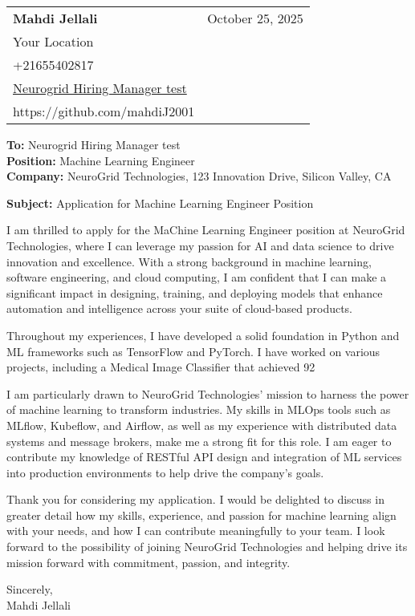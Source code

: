 \documentclass[letterpaper,11pt]{article}
\makeatletter
\newcommand{\letterHeading}[5]{
    \begin{tabular*}{\textwidth}{l@{\extracolsep{\fill}}r}
    \textbf{\Large #1} & #5 \\  %
    #2 & \\
    #3 & \\
    #4 & \\
    \end{tabular*}
    \vspace{15pt}
}
\newcommand{\letterRecipient}[3]{
    \textbf{\large To:} #1 \\
    \textbf{\large Position:} #2 \\
    \textbf{\large Company:} #3 \\
    \vspace{12pt}
}
\newcommand{\letterSubject}[1]{
    \textbf{\large Subject:} #1 \\
    \vspace{15pt}
}
\makeatother
\begin{document}
    \letterHeading
    {Mahdi Jellali}
    {Your Location}
    {+21655402817 \\ \href{mailto:Neurogrid Hiring Manager test}{Neurogrid Hiring Manager test}}
    {https://github.com/mahdiJ2001}
    {October 25, 2025}

    \letterRecipient
    {Neurogrid Hiring Manager test}
    {Machine Learning Engineer}
    {NeuroGrid Technologies, 123 Innovation Drive, Silicon Valley, CA}

    \letterSubject{Application for Machine Learning Engineer Position}

I am thrilled to apply for the MaChine Learning Engineer position at NeuroGrid Technologies, where I can leverage my passion for AI and data science to drive innovation and excellence. With a strong background in machine learning, software engineering, and cloud computing, I am confident that I can make a significant impact in designing, training, and deploying models that enhance automation and intelligence across your suite of cloud-based products.

    Throughout my experiences, I have developed a solid foundation in Python and ML frameworks such as TensorFlow and PyTorch. I have worked on various projects, including a Medical Image Classifier that achieved 92%

    I am particularly drawn to NeuroGrid Technologies' mission to harness the power of machine learning to transform industries. My skills in MLOps tools such as MLflow, Kubeflow, and Airflow, as well as my experience with distributed data systems and message brokers, make me a strong fit for this role. I am eager to contribute my knowledge of RESTful API design and integration of ML services into production environments to help drive the company's goals.

    Thank you for considering my application. I would be delighted to discuss in greater detail how my skills, experience, and passion for machine learning align with your needs, and how I can contribute meaningfully to your team. I look forward to the possibility of joining NeuroGrid Technologies and helping drive its mission forward with commitment, passion, and integrity.

    Sincerely,\\[12pt]

    Mahdi Jellali
\end{document}
